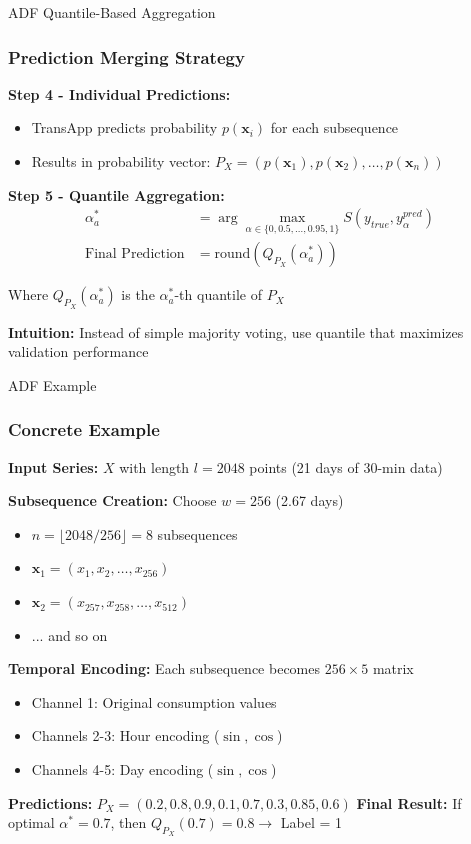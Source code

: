 \documentclass{beamer}
\begin{document}
\begin{frame}{ADF Quantile-Based Aggregation}
\frametitle{Prediction Merging Strategy}

\textbf{Step 4 - Individual Predictions:}
\begin{itemize}
    \item TransApp predicts probability $p(\mathbf{x}_i)$ for each subsequence
    \item Results in probability vector: $P_X = (p(\mathbf{x}_1), p(\mathbf{x}_2), \ldots, p(\mathbf{x}_n))$
\end{itemize}

\vspace{0.3cm}

\textbf{Step 5 - Quantile Aggregation:}
\begin{align}
\alpha_a^* &= \arg\max_{\alpha \in \{0, 0.5, \ldots, 0.95, 1\}} S(y_{true}, y_{\alpha}^{pred}) \\
\text{Final Prediction} &= \text{round}(Q_{P_X}(\alpha_a^*))
\end{align}

Where $Q_{P_X}(\alpha_a^*)$ is the $\alpha_a^*$-th quantile of $P_X$

\vspace{0.3cm}

\textbf{Intuition:} Instead of simple majority voting, use quantile that maximizes validation performance
\end{frame}

\begin{frame}{ADF Example}
\frametitle{Concrete Example}

\textbf{Input Series:} $X$ with length $l = 2048$ points (21 days of 30-min data)

\textbf{Subsequence Creation:} Choose $w = 256$ (2.67 days)
\begin{itemize}
    \item $n = \lfloor 2048/256 \rfloor = 8$ subsequences
    \item $\mathbf{x}_1 = (x_1, x_2, \ldots, x_{256})$
    \item $\mathbf{x}_2 = (x_{257}, x_{258}, \ldots, x_{512})$
    \item ... and so on
\end{itemize}

\textbf{Temporal Encoding:} Each subsequence becomes $256 \times 5$ matrix
\begin{itemize}
    \item Channel 1: Original consumption values
    \item Channels 2-3: Hour encoding ($\sin, \cos$)
    \item Channels 4-5: Day encoding ($\sin, \cos$)
\end{itemize}

\textbf{Predictions:} $P_X = (0.2, 0.8, 0.9, 0.1, 0.7, 0.3, 0.85, 0.6)$
\textbf{Final Result:} If optimal $\alpha^* = 0.7$, then $Q_{P_X}(0.7) = 0.8 \rightarrow$ Label = 1
\end{frame}
\end{document}
